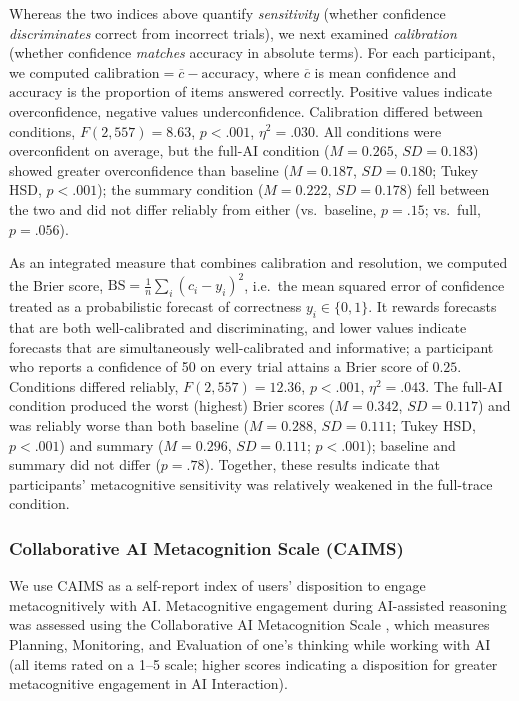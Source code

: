 \documentclass[acmlarge,review=true, anonymous=true]{acmart}
\begin{document}
Whereas the two indices above quantify \emph{sensitivity} (whether confidence \emph{discriminates} correct from incorrect trials), we
next examined \emph{calibration} (whether confidence \emph{matches} accuracy in absolute terms). For each participant, we computed
$\mathrm{calibration} = \overline{c} - \mathrm{accuracy}$, where $\overline{c}$ is mean confidence and $\mathrm{accuracy}$ is the proportion of items answered correctly. Positive values indicate
 overconfidence, negative values underconfidence. Calibration differed between conditions, $F(2, 557) = 8.63$, $p < .001$, $\eta^2 = .030$.
All conditions were overconfident on average, but the full-AI condition ($M = 0.265$, $SD = 0.183$) showed greater overconfidence
than baseline ($M = 0.187$, $SD = 0.180$; Tukey HSD, $p < .001$); the summary condition ($M = 0.222$, $SD = 0.178$) fell between the
two and did not differ reliably from either (vs.\ baseline, $p = .15$; vs.\ full, $p = .056$).

As an integrated measure that combines calibration and resolution, we computed the Brier score, $\mathrm{BS} = \tfrac{1}{n}\sum_{i}(c_i -
y_i)^2$, i.e.\ the mean squared error of confidence treated as a probabilistic forecast of correctness $y_i \in \{0,1\}$. It rewards
forecasts that are both well-calibrated and discriminating, and lower values
indicate forecasts that are simultaneously well-calibrated and informative; a participant who reports a confidence of 50 on every trial
attains a Brier score of $0.25$. Conditions differed reliably, $F(2, 557) = 12.36$, $p < .001$, $\eta^2 = .043$. The full-AI condition produced the worst (highest) Brier scores ($M = 0.342$, $SD = 0.117$) and was reliably worse than both baseline ($M = 0.288$, $SD = 0.111$; Tukey HSD, $p < .001$) and summary ($M = 0.296$, $SD = 0.111$; $p < .001$); baseline and summary did not differ ($p = .78$).
Together, these results indicate that participants' metacognitive sensitivity was relatively weakened in the full-trace condition.  



\subsubsection{Collaborative AI Metacognition Scale (CAIMS)}
We use CAIMS as a self-report index of users' disposition to engage metacognitively with AI. 
Metacognitive engagement during AI-assisted reasoning was assessed using the Collaborative AI Metacognition Scale \cite{Sidra03042026}, which measures Planning, Monitoring, and Evaluation of one's thinking while working with AI (all items rated on a 1--5 scale; higher scores indicating a disposition for greater metacognitive engagement in AI Interaction). 
\end{document}
